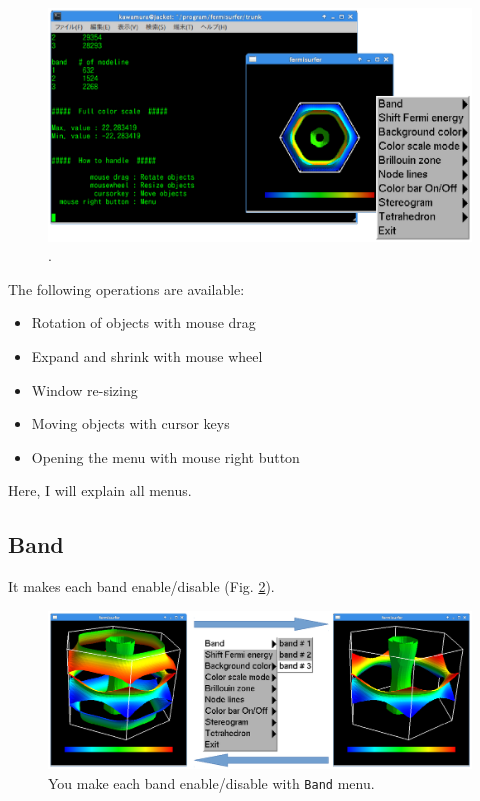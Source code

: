\documentclass[12pt]{article}
\begin{document}
\begin{figure}[!ht]
  \includegraphics[width=17cm]{figs/start.eps}
  \caption{.}
  \label{fig_start}
\end{figure}

The following operations are available:
\begin{itemize}
\item Rotation of objects with mouse drag
\item Expand and shrink with mouse wheel
\item Window re-sizing
\item Moving objects with cursor keys
\item Opening the menu with mouse right button
\end{itemize}

Here, I will explain all menus.

\subsection{Band}

It makes each band enable/disable (Fig. \ref{fig_band}).

\begin{figure}[!ht]
  \includegraphics[width=17cm]{figs/band.eps}
  \caption{You make each band enable/disable with \texttt{Band} menu.}
  \label{fig_band}
\end{figure}
\end{document}
